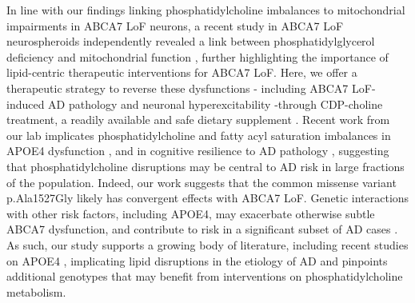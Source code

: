 In line with our findings linking phosphatidylcholine imbalances to mitochondrial impairments in ABCA7 LoF neurons, a recent study in ABCA7 LoF neurospheroids independently revealed a link between phosphatidylglycerol deficiency and mitochondrial function \cite{Kawatani2023-vf}, further highlighting the importance of lipid-centric therapeutic interventions for ABCA7 LoF. Here, we offer a therapeutic strategy to reverse these dysfunctions - including ABCA7 LoF-induced AD pathology and neuronal hyperexcitability -through CDP-choline treatment, a readily available and safe dietary supplement \cite{Gavrilova2018-oi,Zeisel2009-xv,Blusztajn2017-nv}.  Recent work from our lab implicates phosphatidylcholine and fatty acyl saturation imbalances in APOE4 dysfunction \cite{Sienski2021-zt}, and in cognitive resilience to AD pathology \cite{Mathys2024-ex}, suggesting that phosphatidylcholine disruptions may be central to AD risk in large fractions of the population. Indeed, our work suggests that the common missense variant p.Ala1527Gly likely has convergent effects with ABCA7 LoF. Genetic interactions with other risk factors, including APOE4, may exacerbate otherwise subtle ABCA7 dysfunction, and contribute to risk in a significant subset of AD cases \cite{Wang2021-oa,Hemani2013-zr,Haig2011-vs,Zuk2012-uz}. As such, our study supports a growing body of literature, including recent studies on APOE4 \cite{Haney2024-fx,Victor2022-tl}, implicating lipid disruptions in the etiology of AD and pinpoints additional genotypes that may benefit from interventions on phosphatidylcholine metabolism.



